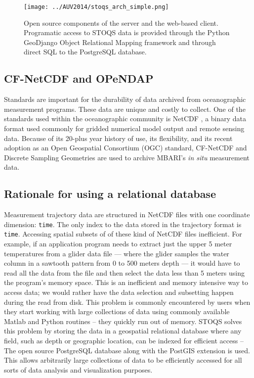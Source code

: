 \documentclass[conference]{IEEEtran}
\begin{document}
\begin{figure}[htbp]
\centering
\texttt{[image: ../AUV2014/stoqs\_arch\_simple.png]}
\caption{Open source components of the server and the web-based client. Programatic access to 
STOQS data is provided through the Python GeoDjango Object Relational Mapping framework 
and through direct SQL to the PostgreSQL database.}
\label{fig:STOQSArch}
\end{figure}

\subsection{CF-NetCDF and OPeNDAP}

Standards are important for the durability of data archived from oceanographic measurement programs. 
These data are unique and costly to collect. One of the standards used within 
the oceanographic community is NetCDF \cite{Rew1990}, a binary data format used 
commonly for gridded numerical model output and remote sensing data. Because of its 
20-plus year history of use, its flexibility, and its recent adoption as an 
Open Geospatial Consortium (OGC) standard, CF-NetCDF and Discrete Sampling Geometries
\cite{DSG} are used to archive MBARI's 
\textit{in situ} measurement data.

\subsection{Rationale for using a relational database}

Measurement trajectory data are
structured in NetCDF files with one coordinate dimension: \texttt{time}. 
  The only index to the data stored in the trajectory format is \texttt{time}. 
Accessing spatial subsets of of these kind of NetCDF files
inefficient.  For example, 
if an application program needs to extract just the upper 5 meter temperatures from 
a glider data file --- where the glider samples the water column in a sawtooth 
pattern from 0 to 500 meters depth --- it would have to read all 
the data from the file and then select the data less than 5 meters using the program's 
memory space.  This is an
inefficient and memory intensive way to access data; we would rather have the data selection
and subsetting happen during the read from disk. This problem is commonly
encountered by users when they start working with large collections of data 
using commonly available Matlab and Python routines -- they quickly run out of memory. 
STOQS solves this problem by storing the 
data in a geospatial relational database where any field, such as depth 
or geographic location, can be indexed for efficient access --
The open source PostgreSQL 
database along with the PostGIS extension is used. This allows arbitrarily large collections
of data to be efficiently accessed for all sorts of data analysis and visualization
purposes.
\end{document}
